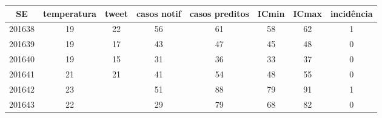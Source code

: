\begin{tabular}{c|ccccccc}
  \hline
SE & temperatura & tweet & casos notif & casos preditos & ICmin & ICmax & incidência \\ 
  \hline
201638 & 19 & 22 & 56 & 61 & 58 & 62 & 1 \\ 
  201639 & 19 & 17 & 43 & 47 & 45 & 48 & 0 \\ 
  201640 & 19 & 15 & 31 & 36 & 33 & 37 & 0 \\ 
  201641 & 21 & 21 & 41 & 54 & 48 & 55 & 0 \\ 
  201642 & 23 &  & 51 & 88 & 79 & 91 & 1 \\ 
  201643 & 22 &  & 29 & 79 & 68 & 82 & 0 \\ 
   \hline
\end{tabular}
